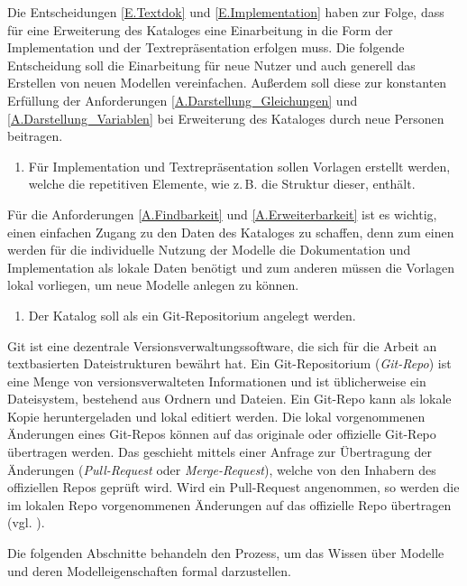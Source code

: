 Die Entscheidungen \ref{E.Textdok} und \ref{E.Implementation} haben zur Folge, dass für eine Erweiterung des Kataloges eine Einarbeitung in die Form der Implementation und der Textrepräsentation erfolgen muss. Die folgende Entscheidung soll die Einarbeitung für neue Nutzer und auch generell das Erstellen von neuen Modellen vereinfachen. Außerdem soll diese zur konstanten Erfüllung der Anforderungen \ref{A.Darstellung_Gleichungen} und \ref{A.Darstellung_Variablen} bei Erweiterung des Kataloges durch neue Personen beitragen.
\begin{enumerate}[resume*]
	\item \label{E.Vorlagen}Für Implementation und Textrepräsentation sollen Vorlagen erstellt werden, welche die repetitiven Elemente, wie z.\,B. die Struktur dieser, enthält. 
\end{enumerate}

Für die Anforderungen \ref{A.Findbarkeit} und \ref{A.Erweiterbarkeit} ist es wichtig, einen einfachen Zugang zu den Daten des Kataloges zu schaffen, denn zum einen werden für die individuelle Nutzung der Modelle die Dokumentation und Implementation als lokale Daten benötigt und zum anderen müssen die Vorlagen lokal vorliegen, um neue Modelle anlegen zu können.
\begin{enumerate}[resume*]
	\item \label{E.Git}Der Katalog soll als ein Git-Repositorium angelegt werden.
\end{enumerate}
Git ist eine dezentrale Versionsverwaltungssoftware, die sich für die Arbeit an textbasierten Dateistrukturen bewährt hat. Ein Git-Repositorium (\textit{Git-Repo}) ist eine Menge von versionsverwalteten Informationen und ist üblicherweise ein Dateisystem, bestehend aus Ordnern und Dateien. Ein Git-Repo kann als lokale Kopie heruntergeladen und lokal editiert werden. Die lokal vorgenommenen Änderungen eines Git-Repos können auf das originale oder offizielle Git-Repo übertragen werden. Das geschieht mittels einer Anfrage zur Übertragung der Änderungen (\textit{Pull-Request} oder \textit{Merge-Request}), welche von den Inhabern des offiziellen Repos geprüft wird. Wird ein Pull-Request angenommen, so werden die im lokalen Repo vorgenommenen Änderungen auf das offizielle Repo übertragen (vgl. \cite[Abschnitt 2.1]{KNHE20a}).

Die folgenden Abschnitte behandeln den Prozess, um das Wissen über Modelle und deren Modelleigenschaften formal darzustellen.
